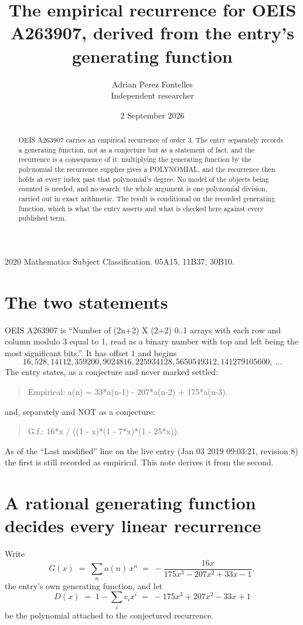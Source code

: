 \documentclass[11pt,a4paper]{article}
\title{The empirical recurrence for OEIS A263907, derived from the entry's generating function}
\author{Adrian Perez Fontelles\\ \small Independent researcher}
\date{2 September 2026}
\theoremstyle{plain}
\theoremstyle{definition}
\begin{document}
\maketitle

\begin{abstract}
OEIS A263907 carries an empirical recurrence of order $3$. The entry separately records a
generating function, not as a conjecture but as a statement of fact, and the recurrence is a
consequence of it: multiplying the generating function by the polynomial the recurrence
supplies gives a POLYNOMIAL, and the recurrence then holds at every index past that
polynomial's degree. No model of the objects being counted is needed, and no search: the
whole argument is one polynomial division, carried out in exact arithmetic. The result is
conditional on the recorded generating function, which is what the entry asserts and what is
checked here against every published term.
\end{abstract}

\noindent\small 2020 Mathematics Subject Classification. 05A15, 11B37, 30B10.\normalsize

\section{The two statements}

OEIS A263907 is ``Number of (2n+2) X (2+2) 0..1 arrays with each row and column modulo 3 equal to 1, read as a binary number with top and left being the most significant bits.''. It has offset $1$ and begins
\[
16, 528, 14112, 359200, 9024816, 225934128, 5650549312, 141279105600,\ \dots
\]
The entry states, as a conjecture and never marked settled:
\begin{quote}
Empirical: a(n) = 33*a(n-1) - 207*a(n-2) + 175*a(n-3).
\end{quote}
and, separately and NOT as a conjecture:
\begin{quote}
G.f.: 16*x / ((1 - x)*(1 - 7*x)*(1 - 25*x)).
\end{quote}
As of the ``Last modified'' line on the live entry (Jan 03 2019 09:03:21, revision 8) the first is still
recorded as empirical. This note derives it from the second.

\section{A rational generating function decides every linear recurrence}

Write
\[
G(x)\;=\;\sum_{n}a(n)\,x^{n}\;=\;- \frac{16 x}{175 x^{3} - 207 x^{2} + 33 x - 1},
\]
the entry's own generating function, and let
\[
D(x)\;=\;1-\sum_i c_i x^{i}\;=\;- 175 x^{3} + 207 x^{2} - 33 x + 1
\]
be the polynomial attached to the conjectured recurrence.
\end{document}
